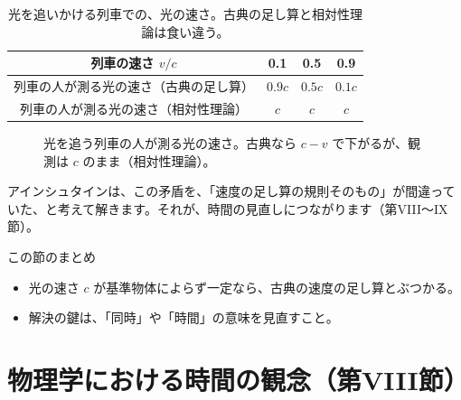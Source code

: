 \documentclass[a4paper,11pt,openany]{ltjsbook}
\begin{document}
\begin{table}[htbp]
\centering
\begin{tabular}{c|ccc}
\toprule
列車の速さ $v/c$ & 0.1 & 0.5 & 0.9\\
\midrule
列車の人が測る光の速さ（古典の足し算） & $0.9c$ & $0.5c$ & $0.1c$\\
列車の人が測る光の速さ（相対性理論） & $c$ & $c$ & $c$\\
\bottomrule
\end{tabular}
\caption{光を追いかける列車での、光の速さ。古典の足し算と相対性理論は食い違う。}
\end{table}

\begin{figure}[htbp]
\centering
{}
\caption{光を追う列車の人が測る光の速さ。古典なら $c-v$ で下がるが、観測は $c$ のまま（相対性理論）。}
\end{figure}

アインシュタインは、この矛盾を、「速度の足し算の規則そのもの」が間違っていた、と考えて解きます。それが、時間の見直しにつながります（第VIII〜IX節）。

\begin{pointbox}{この節のまとめ}
\begin{itemize}[leftmargin=*]
\item 光の速さ $c$ が基準物体によらず一定なら、古典の速度の足し算とぶつかる。
\item 解決の鍵は、「同時」や「時間」の意味を見直すこと。
\end{itemize}
\end{pointbox}

\chapter{物理学における時間の観念（第VIII節）}
\end{document}
